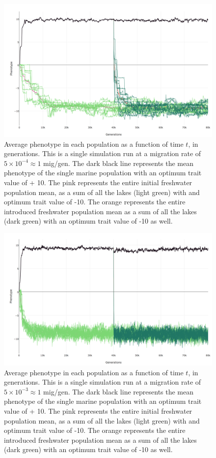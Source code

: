 \documentclass{article}
\begin{document}
\begin{figure}[h!tb]
	\begin{center}
  		\includegraphics[width=0.7\linewidth]{plotlyPlots/PhenotypeThroughout5e-4.png}
  		\caption{ Average phenotype in each population as a function of time $t$, in generations. 
		This is a single simulation run at a migration rate of $5 \times 10^{-4} \approx 1$ mig/gen. 
		The dark black line represents the mean phenotype of the single marine population with an optimum trait value of + 10. 
		The pink represents the entire initial freshwater population mean, 
		as a sum of all the lakes (light green) with and optimum trait value of -10.
		The orange represents the entire introduced freshwater population mean
		as a sum of all the lakes (dark green) with an optimum trait value of -10 as well.
		}
  		\label{fig:phenotype_ts2}
	\end{center}
\end{figure}

\begin{figure}[h!tb]
	\begin{center}
  		\includegraphics[width=0.7\linewidth]{plotlyPlots/PhenotypeThroughout5e-3.png}
  		\caption{Average phenotype in each population as a function of time $t$, in generations. 
		This is a single simulation run at a migration rate of $5 \times 10^{-3} \approx 1$ mig/gen. 
		The dark black line represents the mean phenotype of the single marine population with an optimum trait value of + 10. 
		The pink represents the entire initial freshwater population mean, 
		as a sum of all the lakes (light green) with and optimum trait value of -10.
		The orange represents the entire introduced freshwater population mean
		as a sum of all the lakes (dark green) with an optimum trait value of -10 as well.
		}
  		\label{fig:phenotype_ts3}
	\end{center}
\end{figure}
\end{document}
